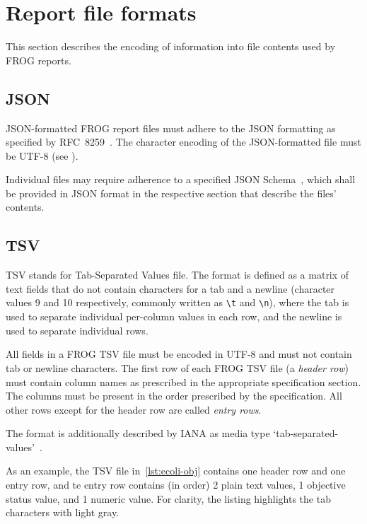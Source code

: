 \section{Report file formats}

This section describes the encoding of information into file contents used by FROG reports.

\subsection{JSON}
\label{sec:json}

JSON-formatted FROG report files must adhere to the JSON formatting as specified by RFC~8259~\cite{rfc8259}.
The character encoding of the JSON-formatted file must be UTF-8 (see \cite[][section 8.1]{rfc8259}).

Individual files may require adherence to a specified JSON Schema~\cite{pezoa2016jsonschema}, which shall be provided in JSON format in the respective section that describe the files' contents.

\subsection{TSV}
\label{sec:tsv}

TSV stands for Tab-Separated Values file. The format is defined as a matrix of text fields that do not contain characters for a tab and a newline (character values 9 and 10 respectively, commonly written as \verb|\t| and \verb|\n|), where the tab is used to separate individual per-column values in each row, and the newline is used to separate individual rows.

All fields in a FROG TSV file must be encoded in UTF-8 and must not contain tab or newline characters. The first row of each FROG TSV file (a \emph{header row}) must contain column names as prescribed in the appropriate specification section. The columns must be present in the order prescribed by the specification. All other rows except for the header row are called \emph{entry rows}.

The format is additionally described by IANA as media type `tab-separated-values'~\cite{ianatsv}.

As an example, the TSV file in~\cref{lst:ecoli-obj} contains one header row and one entry row, and te entry row contains (in order) 2 plain text values, 1 objective status value, and 1 numeric value. For clarity, the listing highlights the tab characters with light gray.

